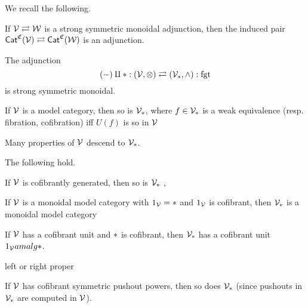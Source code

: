 \documentclass[a4paper,10pt
,draft
]{article}%
\renewcommand{\1}{\eta}%
\begin{document}

We recall the following.

\begin{lemma}
      If $\mathcal V \rightleftarrows \mathcal W$ is a strong symmetric monoidal adjunction, then
      the induced pair $\mathsf{Cat}^{\mathfrak C}(\mathcal V) \rightleftarrows \mathsf{Cat}^{\mathfrak C}(\mathcal W)$ is an adjunction.
\end{lemma}

\begin{lemma}
      The adjunction
      \[
            (-) \amalg \**: (\V,\otimes) \rightleftarrows (\V_{\**}, \wedge) : \mathrm{fgt}
      \]
      is strong symmetric monoidal.

      If $\mathcal V$ is a model category, then so is $\V_{\**}$, where $f \in \V_{\**}$ is a weak equivalence (resp. fibration, cofibration) iff
      $U(f)$ is so in $\mathcal V$ %
\end{lemma}

Many properties of $\mathcal V$ descend to $\V_{\**}$. 

\begin{lemma}
      \label{PT_PROP_LEM}
      The following hold. 
      \begin{enumerate*}[label = (\roman*)]
      \item If $\mathcal V$ is cofibrantly generated, then so is $\V_{\**}$ \cite[Lemma 2.1.21]{Hov99},
      \item If $\mathcal V$ is a monoidal model category with $1_\V = \**$ and $1_{\mathcal V}$ is cofibrant, then $\V_{\**}$ is a monoidal model category \cite[Lemma 4.2.9]{Hov99}
      \item If $\mathcal V$ has a cofibrant unit and $\**$ is cofibrant, then $\V_{\**}$ has a cofibrant unit $1_\V amalg \**$.
      \item left or right proper \cite{Hir}
      \item If $\mathcal V$ has cofibrant symmetric pushout powers, then so does $\V_{\**}$ (since pushouts in $\V_{\**}$ are computed in $\mathcal V$).
      \end{enumerate*}
\end{lemma}
\end{document}

